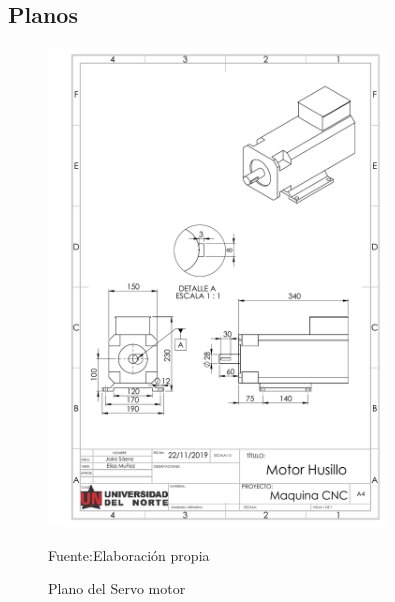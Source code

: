 \subsection{Planos}
\begin{figure}[ht!]
    \centering
    \includegraphics[width =0.8\textwidth]{Cap5_DisenoDetallado/Figuras/motor_electrico.PDF}
    \caption{Plano del Servo motor}{Fuente:Elaboración propia}
    \label{fig:Motor_servo}
\end{figure}
\newpage
